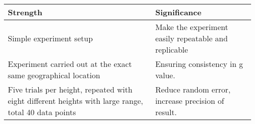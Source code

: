 \begin{center}
    \begin{tabular}{|p{5cm}|p{5cm}|} 
        \hline
        Strength & Significance \\ 
        \hline
        Simple experiment setup & Make the experiment easily repeatable and replicable \\ 
        \hline
        Experiment carried out at the exact same geographical location & Ensuring consistency in g value. \\
        \hline
        Five trials per height, repeated with eight different heights with large range, total 40 data points & Reduce random error, increase precision of result. \\
        \hline
    \end{tabular}
\end{center}
